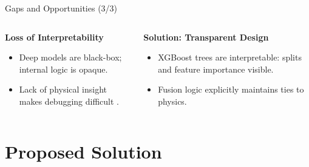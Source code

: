 \documentclass[aspectratio=169,xcolor=dvipsnames]{beamer}
\begin{document}
\begin{frame}{Gaps and Opportunities (3/3)}
\scriptsize
\begin{columns}[T]
    \begin{column}{0.48\textwidth}
    \begin{block}{{\textbf{Loss of Interpretability}}}
    \begin{itemize}
        \item Deep models\cite{golroudbari2023cnn6DOF}\cite{CEAS-GNC-2019-036}\cite{brossard2020openloopCNN} are black-box; internal logic is opaque.
        \item Lack of physical insight makes debugging difficult \cite{chen2024dlsurvey}.
    \end{itemize}
    \end{block}
    \end{column}
    
    \begin{column}{0.48\textwidth}
    \begin{exampleblock}{{\textbf{Solution: Transparent Design}}}
    \begin{itemize}
        \item XGBoost trees are interpretable: splits and feature importance visible.
        \item Fusion logic explicitly maintains ties to physics.
    \end{itemize}
    \end{exampleblock}
    \end{column}
\end{columns}
\end{frame}
\section{Proposed Solution}
\end{document}
